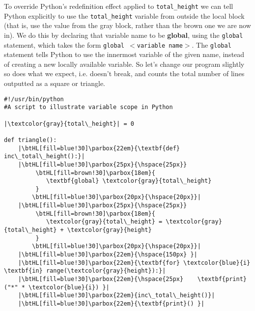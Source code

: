 To override Python's redefinition effect applied to \texttt{total\_height}   we can tell Python explicitly to use the \texttt{total\_height} variable from   outside the local block (that is, use the value from the gray block, rather than the brown one we are now in). We do this by declaring that variable name to   be \textbf{global}, using the \texttt{global} statement, which takes the   form 
\texttt{global $<$variable name$>$}. The \texttt{global} statement   tells Python to use the innermost variable of the given name, instead   of creating a new locally available variable. So let's change our   program slightly so does what we expect, i.e. doesn't break, and counts   the total number of lines outputted as a square or triangle.
\begin{lstlisting}[mathescape,escapechar=|]
#!/usr/bin/python 
#A script to illustrate variable scope in Python 

|\textcolor{gray}{total\_height}| = 0

def triangle(): 
    |\btHL[fill=blue!30]\parbox{22em}{\textbf{def} inc\_total\_height():}|
    |\btHL[fill=blue!30]\parbox{25px}{\hspace{25px}}
         \btHL[fill=brown!30]\parbox{18em}{
            \textbf{global} \textcolor{gray}{total\_height}
         }
        \btHL[fill=blue!30]\parbox{20px}{\hspace{20px}}|
    |\btHL[fill=blue!30]\parbox{25px}{\hspace{25px}}
         \btHL[fill=brown!30]\parbox{18em}{
            \textcolor{gray}{total\_height} = \textcolor{gray}{total\_height} + \textcolor{gray}{height}
         }
        \btHL[fill=blue!30]\parbox{20px}{\hspace{20px}}|
    |\btHL[fill=blue!30]\parbox{22em}{\hspace{150px} }|
    |\btHL[fill=blue!30]\parbox{22em}{\textbf{for} \textcolor{blue}{i} \textbf{in} range(\textcolor{gray}{height}):}|
    |\btHL[fill=blue!30]\parbox{22em}{\hspace{25px}    \textbf{print}("*" * \textcolor{blue}{i}) }|
    |\btHL[fill=blue!30]\parbox{22em}{inc\_total\_height()}|
    |\btHL[fill=blue!30]\parbox{22em}{\textbf{print}() }|


\end{lstlisting}
